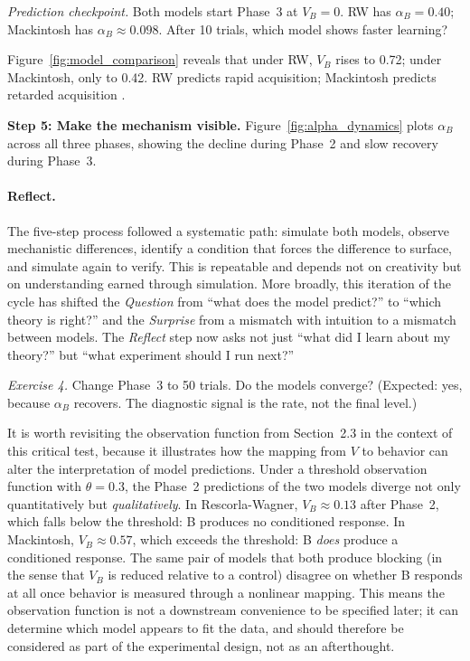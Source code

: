 \documentclass[fleqn,10pt]{wlscirep}
\begin{document}
\begin{linenumbers}
\emph{Prediction checkpoint.} Both models start Phase~3 at $V_B = 0$. RW has $\alpha_B = 0.40$; Mackintosh has $\alpha_B \approx 0.098$. After 10 trials, which model shows faster learning?

Figure~\ref{fig:model_comparison} reveals that under RW, $V_B$ rises to 0.72; under Mackintosh, only to 0.42. RW predicts rapid acquisition; Mackintosh predicts retarded acquisition \citep{lepelley2004role, haselgrove2010overcoming, wills2020progress}.

\textbf{Step 5: Make the mechanism visible.} Figure~\ref{fig:alpha_dynamics} plots $\alpha_B$ across all three phases, showing the decline during Phase~2 and slow recovery during Phase~3.

\paragraph{Reflect.} The five-step process followed a systematic path: simulate both models, observe mechanistic differences, identify a condition that forces the difference to surface, and simulate again to verify. This is repeatable and depends not on creativity but on understanding earned through simulation. More broadly, this iteration of the cycle has shifted the \emph{Question} from ``what does the model predict?'' to ``which theory is right?'' and the \emph{Surprise} from a mismatch with intuition to a mismatch between models. The \emph{Reflect} step now asks not just ``what did I learn about my theory?'' but ``what experiment should I run next?''

\emph{Exercise 4.} Change Phase~3 to 50 trials. Do the models converge? (Expected: yes, because $\alpha_B$ recovers. The diagnostic signal is the rate, not the final level.)

It is worth revisiting the observation function from Section~2.3 in the context of this critical test, because it illustrates how the mapping from $V$ to behavior can alter the interpretation of model predictions. Under a threshold observation function with $\theta = 0.3$, the Phase~2 predictions of the two models diverge not only quantitatively but \emph{qualitatively}. In Rescorla-Wagner, $V_B \approx 0.13$ after Phase~2, which falls below the threshold: B produces no conditioned response. In Mackintosh, $V_B \approx 0.57$, which exceeds the threshold: B \emph{does} produce a conditioned response. The same pair of models that both produce blocking (in the sense that $V_B$ is reduced relative to a control) disagree on whether B responds at all once behavior is measured through a nonlinear mapping. This means the observation function is not a downstream convenience to be specified later; it can determine which model appears to fit the data, and should therefore be considered as part of the experimental design, not as an afterthought.


\end{linenumbers}
\end{document}
